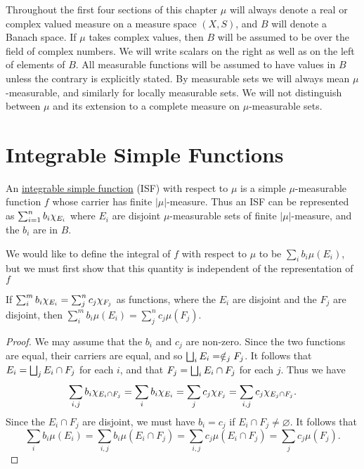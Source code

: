 

Throughout the first four sections of this chapter $\mu$ will always denote a real or complex valued measure on a measure space $(X,S)$, and $B$ will denote a Banach space. If $\mu$ takes complex values, then $B$ will be assumed to be over the field of complex numbers. We will write scalars on the right as well as on the left of elements of $B$. All measurable functions will be assumed to have values in $B$ unless the contrary is explicitly stated. By measurable sets we will always mean $\mu$-measurable, and similarly for locally measurable sets. We will not distinguish between $\mu$ and its extension to a complete measure on $\mu$-measurable sets.

\section{Integrable Simple Functions}

\begin{definition} 
An \underline{integrable simple function} (ISF) with respect to $\mu$ is a simple $\mu$-measurable function $f$ whose carrier has finite $|\mu|$-measure. Thus an ISF can be represented as $\sum_{i=1}^nb_i\chi_{E_i}$ where $E_i$ are disjoint $\mu$-measurable sets of finite $|\mu|$-measure, and the $b_i$ are in $B$.
\end{definition}

We would like to define the integral of $f$ with respect to $\mu$ to be $\sum_ib_i\mu(E_i)$, but we must first show that this quantity is independent of the representation of $f$

\begin{lemma}
If $\sum_i^mb_i\chi_{E_i}=\sum_j^nc_j\chi_{F_j}$ as functions, where the $E_i$ are disjoint and the $F_j$ are disjoint, then $\sum_i^mb_i\mu(E_i)=\sum_j^nc_j\mu(F_j)$.
\end{lemma}

\begin{proof}
We may assume that the $b_i$ and $c_j$ are non-zero. Since the two functions are equal, their carriers are equal, and so $\bigsqcup_i E_i=\notin_j F_j$. It follows that $E_i=\bigsqcup_j E_i \cap F_j$ for each $i$, and that $F_j=\bigsqcup_iE_i \cap F_j$ for each $j$. Thus we have $$\sum_{i, j}b_i\chi_{E_i \cap F_j}=\sum_i b_i\chi_{E_i}=\sum_jc_j\chi_{F_j}=\sum_{i, j} c_j\chi_{E_j\cap F_j}.$$ Since the $E_i \cap F_j$ are disjoint, we must have $b_i=c_j$ if $E_i \cap F_j \neq \varnothing$. It follows that $$\sum_ib_i\mu(E_i)=\sum_{i,j}b_i\mu(E_i\cap F_j)=\sum_{i,j}c_j\mu(E_i\cap F_j)=\sum_jc_j\mu(F_j).$$
\end{proof}


